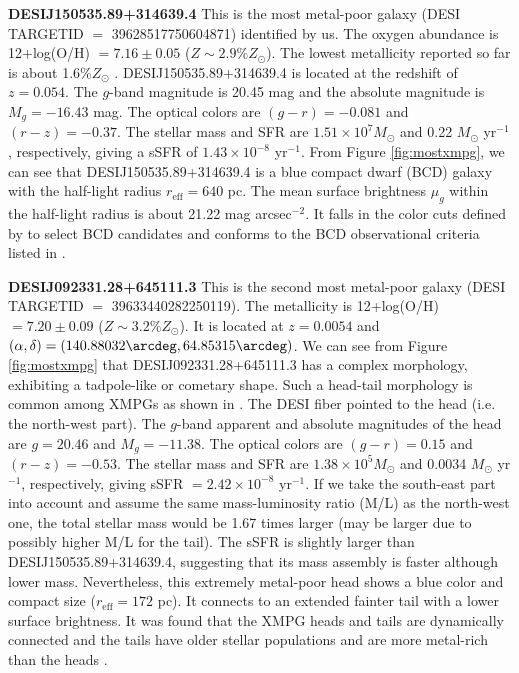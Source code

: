 \documentclass[twocolumn]{aastex631}
\newcommand{\Msun}{\mbox{$M_{\odot}$}}
\newcommand{\Zsun}{\mbox{$Z_{\odot}$}}
\begin{document}
\textbf{DESIJ150535.89+314639.4} This is the most metal-poor galaxy (DESI TARGETID $=$ 39628517750604871) identified by us. The oxygen abundance is 12+log(O/H) $=7.16\pm0.05$ ($Z \sim 2.9\%\Zsun$). The lowest metallicity reported so far is about 1.6\%{\Zsun} \citep{Koj20}. DESIJ150535.89+314639.4 is located at the redshift of $z=0.054$. The $g$-band magnitude is 20.45 mag and the absolute magnitude is $M_g=-16.43$ mag. The optical colors are $(g-r)=-0.081$ and $(r-z)=-0.37$. The stellar mass and SFR are $1.51\times10^7\Msun$ and 0.22 {\Msun} yr$^{-1}$, respectively, giving a sSFR of $1.43\times10^{-8}$ yr$^{-1}$. From Figure \ref{fig:mostxmpg}, we can see that DESIJ150535.89+314639.4 is a blue compact dwarf (BCD) galaxy with the half-light radius $r_\mathrm{eff} = 640$ pc. The mean surface brightness $\mu_g$ within the half-light radius is about 21.22 mag arcsec$^{-2}$. It falls in the color cuts defined by \citet{Hsy18} to select BCD candidates and conforms to the BCD observational criteria listed in \citet{Mor11}. 

\textbf{DESIJ092331.28+645111.3} This is the second most metal-poor galaxy (DESI TARGETID $=$ 39633440282250119). The metallicity is 12+log(O/H) $=7.20\pm0.09$ ($Z\sim 3.2\%\Zsun$). It is located at $z=0.0054$ and $(\alpha, \delta)=(140.88032\arcdeg, 64.85315\arcdeg)$. We can see from Figure \ref{fig:mostxmpg} that DESIJ092331.28+645111.3 has a complex morphology, exhibiting a tadpole-like or cometary shape. Such a head-tail morphology is common among XMPGs as shown in \citet{Mor11, San16a, Koj20}. The DESI fiber pointed to the head (i.e. the north-west part). The $g$-band apparent and absolute magnitudes of the head are $g=20.46$ and $M_g=-11.38$. The optical colors are $(g-r)=0.15$ and $(r-z)=-0.53$.  The stellar mass and SFR are $1.38\times10^5\Msun$ and 0.0034 {\Msun} yr$^{-1}$, respectively, giving sSFR $= 2.42\times10^{-8}$ yr$^{-1}$. If we take the south-east part into account and assume the same mass-luminosity ratio (M/L) as the north-west one, the total stellar mass would be 1.67 times larger (may be larger due to possibly higher M/L for the tail). The sSFR is slightly larger than DESIJ150535.89+314639.4, suggesting that its mass assembly is faster although lower mass. Nevertheless, this extremely metal-poor head shows a blue color and compact size ($r_\mathrm{eff}=172$ pc). It connects to an extended fainter tail with a lower surface brightness. It was found that the XMPG heads and tails are dynamically connected and the tails have older stellar populations and are more metal-rich than the heads \citep{San15}.
\end{document}
